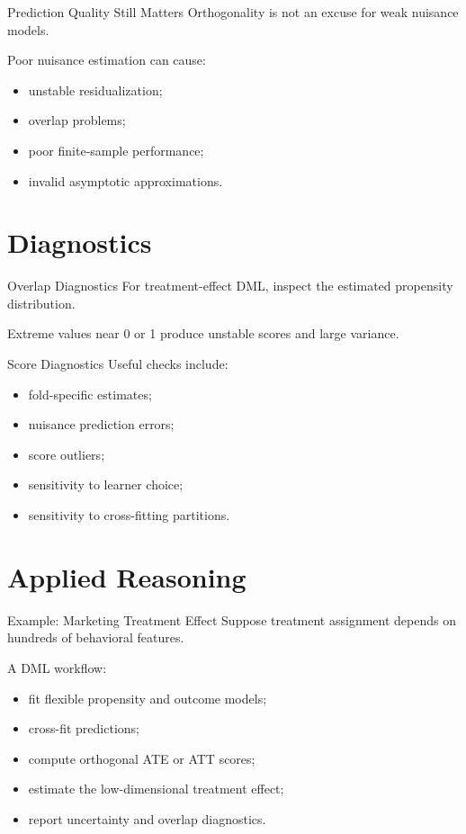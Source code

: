 \documentclass[aspectratio=169,11pt]{beamer}
\begin{document}
\begin{frame}{Prediction Quality Still Matters}
Orthogonality is not an excuse for weak nuisance models.

Poor nuisance estimation can cause:
\begin{itemize}
\item unstable residualization;
\item overlap problems;
\item poor finite-sample performance;
\item invalid asymptotic approximations.
\end{itemize}
\end{frame}

\section{Diagnostics}

\begin{frame}{Overlap Diagnostics}
For treatment-effect DML, inspect the estimated propensity distribution.

Extreme values near 0 or 1 produce unstable scores and large variance.
\end{frame}

\begin{frame}{Score Diagnostics}
Useful checks include:
\begin{itemize}
\item fold-specific estimates;
\item nuisance prediction errors;
\item score outliers;
\item sensitivity to learner choice;
\item sensitivity to cross-fitting partitions.
\end{itemize}
\end{frame}

\section{Applied Reasoning}

\begin{frame}{Example: Marketing Treatment Effect}
Suppose treatment assignment depends on hundreds of behavioral features.

A DML workflow:
\begin{itemize}
\item fit flexible propensity and outcome models;
\item cross-fit predictions;
\item compute orthogonal ATE or ATT scores;
\item estimate the low-dimensional treatment effect;
\item report uncertainty and overlap diagnostics.
\end{itemize}
\end{frame}
\end{document}
